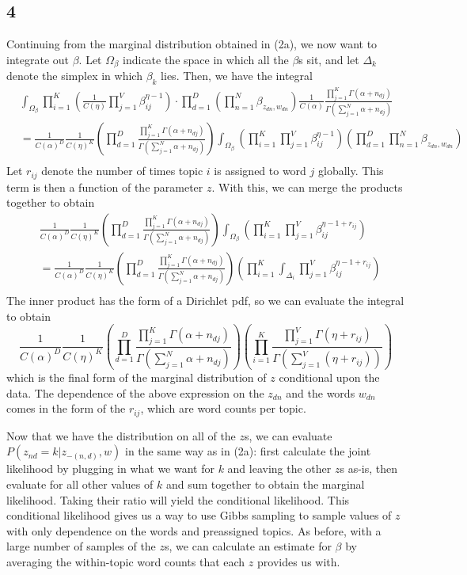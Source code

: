 \documentclass{article}
\begin{document}
\subsection*{4}
Continuing from the marginal distribution obtained in (2a), we now want to integrate out $\beta$. Let $\Omega_\beta$ indicate the space in which all the $\beta$s sit, and let $\Delta_k$ denote the simplex in which $\beta_k$ lies. Then, we have the integral
\begin{align*}
    &\int_{\Omega_\beta}\prod_{i=1}^K\left(\frac{1}{C(\eta)}\prod_{j=1}^V\beta_{ij}^{\eta-1}\right)\cdot\prod_{d=1}^D\left(\prod_{n=1}^N\beta_{z_{dn},w_{dn}}\right)\frac{1}{C(\alpha)}\frac{\prod_{j=1}^K\Gamma(\alpha+n_{dj})}{\Gamma(\sum_{j=1}^N\alpha+n_{dj})}\\
    &=\frac{1}{C(\alpha)^D}\frac{1}{C(\eta)^K}\left(\prod_{d=1}^D\frac{\prod_{j=1}^K\Gamma(\alpha+n_{dj})}{\Gamma(\sum_{j=1}^N\alpha+n_{dj})}\right)\int_{\Omega_\beta}\left(\prod_{i=1}^K\prod_{j=1}^V\beta_{ij}^{\eta-1}\right)\left(\prod_{d=1}^D\prod_{n=1}^N\beta_{z_{dn},w_{dn}}\right)\\
\end{align*}
Let $r_{ij}$ denote the number of times topic $i$ is assigned to word $j$ globally. This term is then a function of the parameter $z$. With this, we can merge the products together to obtain
\begin{align*}
    &\frac{1}{C(\alpha)^D}\frac{1}{C(\eta)^K}\left(\prod_{d=1}^D\frac{\prod_{j=1}^K\Gamma(\alpha+n_{dj})}{\Gamma(\sum_{j=1}^N\alpha+n_{dj})}\right)\int_{\Omega_\beta}\left(\prod_{i=1}^K\prod_{j=1}^V\beta_{ij}^{\eta-1+r_{ij}}\right)\\
    &=\frac{1}{C(\alpha)^D}\frac{1}{C(\eta)^K}\left(\prod_{d=1}^D\frac{\prod_{j=1}^K\Gamma(\alpha+n_{dj})}{\Gamma(\sum_{j=1}^N\alpha+n_{dj})}\right)\left(\prod_{i=1}^K\int_{\Delta_i}\prod_{j=1}^V\beta_{ij}^{\eta-1+r_{ij}}\right)\\
\end{align*}
The inner product has the form of a Dirichlet pdf, so we can evaluate the integral to obtain
\[\frac{1}{C(\alpha)^D}\frac{1}{C(\eta)^K}\left(\prod_{d=1}^D\frac{\prod_{j=1}^K\Gamma(\alpha+n_{dj})}{\Gamma(\sum_{j=1}^N\alpha+n_{dj})}\right)\left(\prod_{i=1}^K\frac{\prod_{j=1}^V\Gamma(\eta+r_{ij})}{\Gamma\left(\sum_{j=1}^V(\eta+r_{ij})\right)}\right)\]
which is the final form of the marginal distribution of $z$ conditional upon the data. The dependence of the above expression on the $z_{dn}$ and the words $w_{dn}$ comes in the form of the $r_{ij}$, which are word counts per topic.

Now that we have the distribution on all of the $z$s, we can evaluate $P(z_{nd}=k|z_{-(n,d)},w)$ in the same way as in (2a): first calculate the joint likelihood by plugging in what we want for $k$ and leaving the other $z$s as-is, then evaluate for all other values of $k$ and sum together to obtain the marginal likelihood. Taking their ratio will yield the conditional likelihood.
This conditional likelihood gives us a way to use Gibbs sampling to sample values of $z$ with only dependence on the words and preassigned topics. As before, with a large number of samples of the $z$s, we can calculate an estimate for $\beta$ by averaging the within-topic word counts that each $z$ provides us with.
\end{document}
